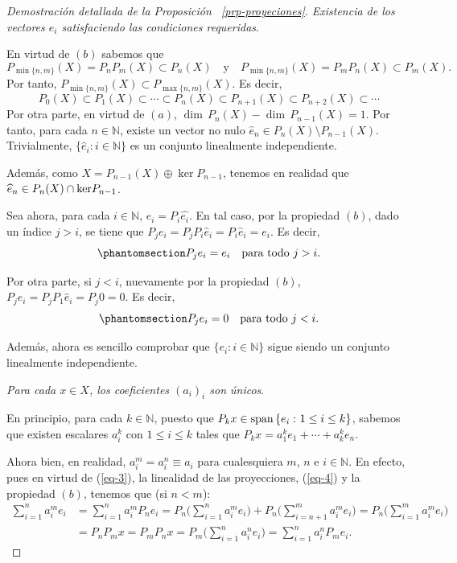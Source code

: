 \documentclass[
  spanish,
  letterpaper,
  DIV=11,
  numbers=noendperiod]{scrreprt}
\theoremstyle{definition}
\theoremstyle{remark}
\theoremstyle{definition}
\theoremstyle{exampstyle}
\theoremstyle{plain}
\theoremstyle{plain}
\theoremstyle{definition}
\theoremstyle{plain}
\theoremstyle{remark}
\begin{document}
\begin{proof}[Demostración detallada de la Proposición
~\ref{prp-proyeciones}]
\leavevmode

\hspace*{1cm}

\emph{Existencia de los vectores \(e_i\) satisfaciendo las condiciones
requeridas}.

En virtud de \((b)\) sabemos que \[
P_{\min\{n,m\}}(X)=P_nP_m(X) \subset P_n(X)\quad\text{y}\quad P_{\min\{n,m\}}(X)=P_mP_n(X)\subset P_m(X).
\] Por tanto, \(P_{\min\{n,m\}}(X) \subset P_{\max\{n,m\}}(X)\). Es
decir,
\[P_0(X) \subset P_1(X) \subset \cdots \subset P_n(X) \subset P_{n+1}(X) \subset P_{n+2}(X) \subset \cdots
\] Por otra parte, en virtud de \((a)\),
\(\dim\,P_n(X)-\dim\,P_{n-1}(X)=1\). Por tanto, para cada
\(n\in\mathbb{N}\), existe un vector no nulo
\(\widehat{e}_n\in P_n(X)\setminus P_{n-1}(X)\). Trivialmente,
\(\{\widehat{e}_i\colon i\in\mathbb{N}\}\) es un conjunto linealmente
independiente.

Además, como \(X=P_{n-1}(X)\oplus{\ker P_{n-1}}\), tenemos en realidad
que \(\widehat{e}_n\in P_n(X)\cap {\rm ker}P_{n-1}\).

Sea ahora, para cada \(i\in\mathbb{N}\), \(e_i=P_i\widehat{e_i}\). En
tal caso, por la propiedad \((b)\), dado un índice \(j>i\), se tiene que
\(P_je_i=P_jP_i\widehat{e}_i=P_i\widehat{e}_i=e_i\). Es decir,
\begin{equation}\protect\phantomsection\label{eq-3}{
    P_je_i=e_i\quad\text{para todo $j>i$.}    
}\end{equation}

Por otra parte, si \(j<i\), nuevamente por la propiedad \((b)\),
\(P_je_i=P_jP_1\widehat{e}_i=P_j0=0\). Es decir,\\
\begin{equation}\protect\phantomsection\label{eq-4}{
    P_je_i=0\quad\text{para todo $j<i$.}    
}\end{equation}

Además, ahora es sencillo comprobar que \(\{e_i\colon i\in\mathbb{N}\}\)
sigue siendo un conjunto linealmente independiente.

\emph{Para cada \(x\in X\), los coeficientes \((a_i)_i\) son únicos}.

En principio, para cada \(k\in\mathbb{N}\), puesto que
\(P_kx\in{\rm span}\,\{e_i\, \colon 1\leq i\leq k\}\), sabemos que
existen escalares \(a^k_i\) con \(1\leq i\leq k\) tales que
\(P_kx=a_1^ke_1+\cdots +a_k^k e_n\).

Ahora bien, en realidad, \(a_i^m=a_i^n\equiv a_i\) para cualesquiera
\(m\), \(n\) e \(i\in\mathbb{N}\). En efecto, pues en virtud de
(\ref{eq-3}), la linealidad de las proyecciones, (\ref{eq-4}) y la
propiedad \((b)\), tenemos que (si \(n<m\)):
\begin{align*}
    \sum_{i=1}^na_i^m e_i&=\sum_{i=1}^na_i^mP_ne_i=P_n\Big(\sum_{i=1}^n a_i^me_i\Big)+P_n\Big(\sum_{i=n+1}^m a_i^me_i\Big)=P_n\Big(\sum_{i=1}^m a_i^me_i\Big)\\
    &=P_nP_mx=P_mP_nx=P_m\Big(\sum_{i=1}^n a_i^ne_i\Big)=\sum_{i = 1}^n{a_i^nP_me_i}.
\end{align*}


\end{proof}
\end{document}
